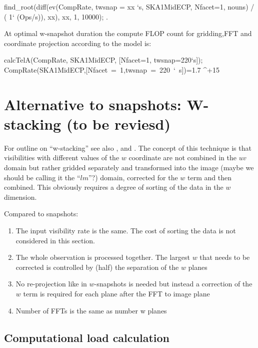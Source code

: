 \documentclass[useAMS,usenatbib,referee]{article}
\begin{document}
\begin{maxima}[]
  find_root(diff(ev(CompRate, twsnap = xx `s, SKA1MidECP, Nfacet=1, nouns) / ( 1` (Ops/s)), xx), xx, 1, 10000);
\maximaoutput*
{}. \\
\end{maxima}

At optimal w-snapshot duration the compute FLOP count for gridding,FFT
and coordinate projection according to the model is:
\begin{maxima}[]
calcTelA(CompRate, SKA1MidECP, [Nfacet=1, twsnap=220`s]);
\maximaoutput*
\m  \mbox{{}CompRate(SKA1MidECP,[Nfacet = 1,twsnap = 220 ` s]){}}=1.7 ^{+15} \\
\end{maxima}


\section{Alternative to snapshots: W-stacking (to be reviesd)} 

For outline on ``w-stacking'' see also
\cite{VoronkovCalim2010Gridding}, and \cite{2013A&A...553A.105T}. The
concept of this technique is that visibilities with different values
of the $w$ coordinate are not combined in the $uv$ domain but rather
gridded separately and transformed into the image (maybe we should be
calling it the ``$lm$''?) domain, corrected for the $w$ term and then
combined. This obviously requires a degree of sorting of the data in
the $w$ dimension.

Compared to snapshots:
\begin{enumerate}
  \item The input visibility rate is the same. The cost of sorting the
    data is not considered in this section.
  \item The whole observation is processed together. The largest $w$
    that needs to be corrected is controlled by (half) the separation
    of the $w$ planes
  \item No re-projection like in $w$-snapshots is needed but instead a
    correction of the $w$ term is required for each plane after the
    FFT to image plane
  \item Number of FFTs is the same as number w planes
\end{enumerate}

\subsection{Computational load calculation}
\end{document}
